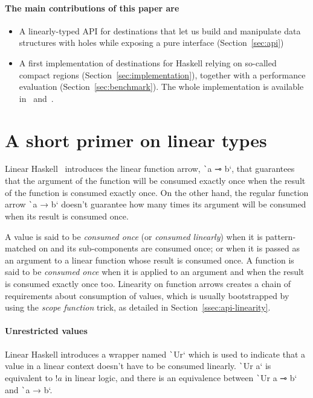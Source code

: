 \documentclass[english]{jflart}
\begin{document}
\paragraph{The main contributions of this paper are}
\begin{itemize}
\item A linearly-typed API for destinations that let us build and manipulate data structures with holes while exposing a pure interface (Section~\ref{sec:api})
\item A first implementation of destinations for Haskell relying on so-called compact regions (Section~\ref{sec:implementation}), together with a performance evaluation (Section~\ref{sec:benchmark}). The whole implementation is available in~\cite{custom_ghc} and~\cite{linear_dest}.
\end{itemize}

\section{A short primer on linear types}\label{sec:intro-linearity}

Linear Haskell~\cite{bernardy_linear_2018} introduces the linear function arrow, \texttt`a ⊸ b`, that guarantees that the argument of the function will be consumed exactly once when the result of the function is consumed exactly once. On the other hand, the regular function arrow \texttt`a → b` doesn't guarantee how many times its argument will be consumed when its result is consumed once.

A value is said to be \emph{consumed once} (or \emph{consumed linearly}) when it is pattern-matched on and its sub-components are consumed once; or when it is passed as an argument to a linear function whose result is consumed once. A function is said to be \emph{consumed once} when it is applied to an argument and when the result is consumed exactly once too. Linearity on function arrows creates a chain of requirements about consumption of values, which is usually bootstrapped by using the \emph{scope function} trick, as detailed in Section~\ref{ssec:api-linearity}.

\paragraph{Unrestricted values}

Linear Haskell introduces a wrapper named \texttt`Ur` which is used to indicate that a value in a linear context doesn't have to be consumed linearly. \texttt`Ur a` is equivalent to $!a$ in linear logic, and there is an equivalence between \texttt`Ur a ⊸ b` and \texttt`a → b`.
\end{document}
